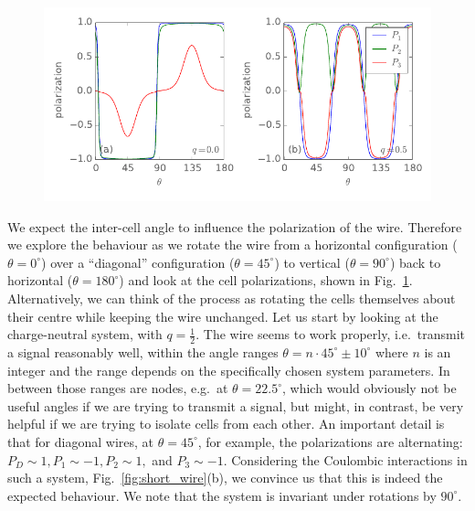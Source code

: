 %
\begin{figure}
  \center
  \includegraphics{three_cells_P_over_theta}
  \caption{
  }
  \label{fig:three_cells_P_over_theta}
\end{figure}
%
We expect the inter-cell angle to influence the polarization of the wire.
Therefore we explore the behaviour as we rotate the wire from a horizontal
configuration ($\theta = 0^{\circ}$) over a ``diagonal'' configuration ($\theta
= 45^{\circ}$) to vertical ($\theta = 90^{\circ}$) back to horizontal ($\theta =
180^{\circ}$) and look at the cell polarizations, shown in
Fig.~\ref{fig:three_cells_P_over_theta}. Alternatively, we can think of the
process as rotating the cells themselves about their centre while keeping the
wire unchanged. Let us start by looking at the charge-neutral system, with
$q=\frac{1}{2}$. The wire seems to work properly, i.e.~transmit a signal
reasonably well, within the angle ranges $\theta = n \cdot 45^{\circ} \pm
10^{\circ}$ where $n$ is an integer and the range depends on the specifically
chosen system parameters. In between those ranges are nodes, e.g.~at $\theta =
22.5^{\circ}$, which would obviously not be useful angles if we are trying to
transmit a signal, but might, in contrast, be very helpful if we are trying to
isolate cells from each other. An important detail is that for diagonal wires,
at $\theta = 45^{\circ}$, for example, the polarizations are alternating: $P_D
\sim 1, P_1 \sim -1, P_2 \sim 1,$ and $P_3 \sim -1$.  Considering the Coulombic
interactions in such a system, Fig.~\ref{fig:short_wire}(b), we convince us that
this is indeed the expected behaviour. We note that the system is invariant
under rotations by $90^{\circ}$.

